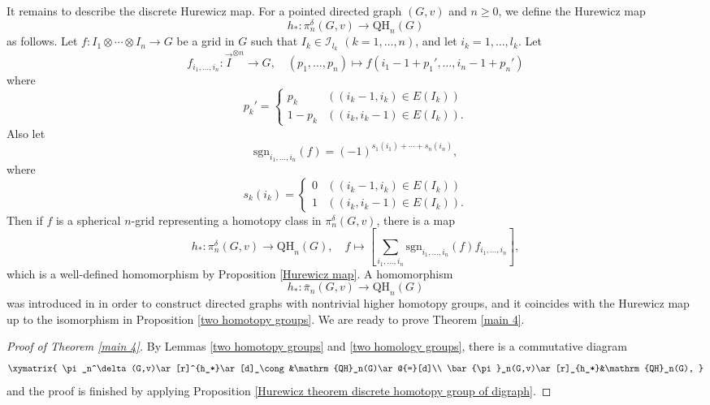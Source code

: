 \documentclass[oneside, 12pt]{amsart}
\numberwithin{equation}{section}
\theoremstyle{plain}
\newtheorem{proposition}[theorem]{Proposition}
\theoremstyle{definition}
\theoremstyle{remark}
\begin{document}
	It remains to describe the discrete Hurewicz map. For a pointed directed graph $(G,v)$ and $n\ge0$, we define the Hurewicz map
	\[
	h_*\colon\pi_n^\delta(G,v)\to \mathrm{QH}_n(G)
	\]
	as follows. Let $f\colon I_1\otimes\cdots\otimes I_n\to G$ be a grid in $G$ such that $I_k\in\mathcal{I}_{l_k}$ $(k=1,\ldots,n)$, and let $i_k=1,\ldots,l_k$. Let
	\[
	f_{i_1,\ldots,i_n}\colon\vec{I}^{\otimes n}\to G,\quad(p_1,\ldots,p_n)\mapsto f(i_1-1+p_1',\ldots,i_n-1+p_n')
	\]
	where
	\[
	p_k'=\begin{cases}
		p_k&((i_k-1,i_k)\in E(I_k))\\
		1-p_k&((i_k,i_k-1)\in E(I_k)).
	\end{cases}
	\]
	Also let
	\[
	\mathrm{sgn}_{i_1,\ldots,i_n}(f)=(-1)^{s_1(i_1)+\cdots+s_n(i_n)},
	\]
	where
	\[
	s_k(i_k)=\begin{cases}
		0&((i_k-1,i_k)\in E(I_k))\\
		1&((i_k,i_k-1)\in E(I_k)).
	\end{cases}
	\]
	Then if $f$ is a spherical $n$-grid representing a homotopy class in $\pi_n^\delta(G,v)$, there is a map
	\[
	h_*\colon\pi_n^\delta(G,v)\to \mathrm{QH}_n(G),\quad f\mapsto\left[\sum_{i_1,\ldots,i_n}\mathrm{sgn}_{i_1,\ldots,i_n}(f)f_{i_1,\ldots,i_n}\right],
	\]
	which is a well-defined homomorphism by Proposition \ref{Hurewicz map}. A homomorphism 
	\[
	h_*\colon\bar{\pi}_n(G,v)\to \mathrm{QH}_n(G)
	\]
	was introduced in \cite{TWYZ} in order to construct directed graphs with nontrivial higher homotopy groups, and it coincides with the Hurewicz map up to the isomorphism in Proposition \ref{two homotopy groups}. We are ready to prove Theorem \ref{main 4}.
	\begin{proof}
		[Proof of Theorem \ref{main 4}]
		By Lemmas \ref{two homotopy groups} and \ref{two homology groups}, there is a commutative diagram
		\[
		\xymatrix{
			\pi_n^\delta(G,v)\ar[r]^{h_*}\ar[d]_\cong&\mathrm{QH}_n(G)\ar@{=}[d]\\
			\bar{\pi}_n(G,v)\ar[r]_{h_*}&\mathrm{QH}_n(G),
		}
		\]
		and the proof is finished by applying Proposition \ref{Hurewicz theorem discrete homotopy group of digraph}.
	\end{proof}
	
	
\end{document}
